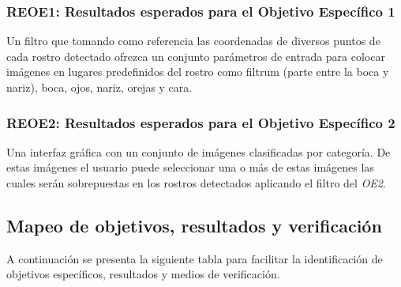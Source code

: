 \documentclass[a4paper,openright,12pt]{report}
\begin{document}
\subsubsection{REOE1: Resultados esperados para el Objetivo Específico 1}
Un filtro que tomando como referencia las coordenadas de diversos puntos de cada
rostro detectado ofrezca un conjunto parámetros de entrada para colocar imágenes
en lugares predefinidos del rostro como filtrum (parte entre la boca y nariz),
boca, ojos, nariz, orejas y cara.
\subsubsection{REOE2: Resultados esperados para el Objetivo Específico 2}
Una interfaz gráfica con un conjunto de imágenes clasificadas por categoría. De
estas imágenes el usuario puede seleccionar una o más de estas imágenes las
cuales serán sobrepuestas en los rostros detectados aplicando el filtro del
\textit{OE2}.

\subsection{Mapeo de objetivos, resultados y verificación}

A continuación se presenta la siguiente tabla para facilitar la identificación
de objetivos específicos, resultados y medios de verificación.
\end{document}
